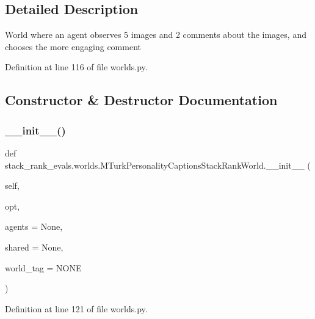 \subsection{Detailed Description}
\begin{DoxyVerb}World where an agent observes 5 images and 2 comments about the images,
   and chooses the more engaging comment
\end{DoxyVerb}
 

Definition at line 116 of file worlds.\+py.



\subsection{Constructor \& Destructor Documentation}
\mbox{\label{classstack__rank__evals_1_1worlds_1_1MTurkPersonalityCaptionsStackRankWorld_ac193f25378717137c8681550c972be8a}} 
\subsubsection{\texorpdfstring{\+\_\+\+\_\+init\+\_\+\+\_\+()}{\_\_init\_\_()}}
{\footnotesize\ttfamily def stack\+\_\+rank\+\_\+evals.\+worlds.\+M\+Turk\+Personality\+Captions\+Stack\+Rank\+World.\+\_\+\+\_\+init\+\_\+\+\_\+ (\begin{DoxyParamCaption}\item[{}]{self,  }\item[{}]{opt,  }\item[{}]{agents = {\ttfamily None},  }\item[{}]{shared = {\ttfamily None},  }\item[{}]{world\+\_\+tag = {\ttfamily \textquotesingle{}NONE\textquotesingle{}} }\end{DoxyParamCaption})}



Definition at line 121 of file worlds.\+py.



